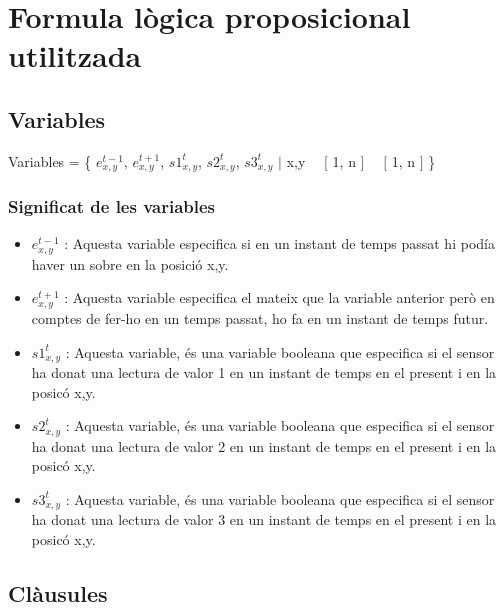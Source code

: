 \documentclass[a4paper,12pt]{article}
\begin{document}

\newpage

\section{Formula lògica proposicional utilitzada}
\subsection{Variables}


\begin{center}

    Variables = \{ $e_{x,y} ^ {t-1}$, $e_{x,y} ^ {t+1}$, $s1_{x,y} ^ {t}$, $s2_{x,y} ^ {t}$, $s3_{x,y} ^ {t}$ $|$ \forall x,y \ \in \ $[$ 1, n $]$ \ \times \ $[$ 1, n $]$ \}
    
\end{center}

\subsubsection{Significat de les variables}

\begin{itemize}
    \item $e_{x,y} ^ {t-1}$ : Aquesta variable especifica si en un instant de temps passat hi podía haver un sobre en la posició x,y.
    \item $e_{x,y} ^ {t+1}$ : Aquesta variable especifica el mateix que la variable anterior però en comptes de fer-ho en un temps passat, ho fa en un instant de temps futur.
    \item $s1_{x,y} ^ {t}$ : Aquesta variable, és una variable booleana que especifica si el sensor ha donat una lectura de valor 1 en un instant de temps en el present i en la posicó x,y.
    \item $s2_{x,y} ^ {t}$ : Aquesta variable, és una variable booleana que especifica si el sensor ha donat una lectura de valor 2 en un instant de temps en el present i en la posicó x,y.
    \item $s3_{x,y} ^ {t}$ : Aquesta variable, és una variable booleana que especifica si el sensor ha donat una lectura de valor 3 en un instant de temps en el present i en la posicó x,y.
\end{itemize}

\subsection{Clàusules}
\end{document}
